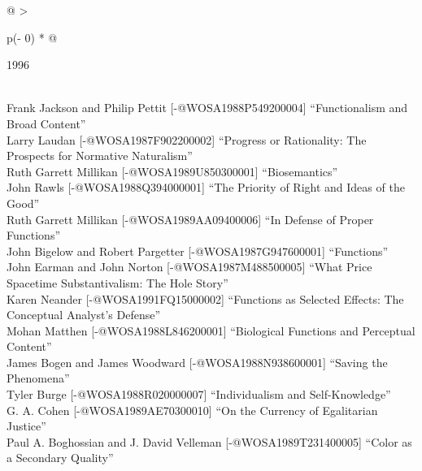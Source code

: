 \documentclass[
  10pt,
  letterpaper,
  DIV=11,
  numbers=noendperiod,
  twoside]{scrartcl}
\begin{document}
\begin{longtable}[]{@{}
  >{\raggedright\arraybackslash}p{(\columnwidth - 0\tabcolsep) * }@{}}

\caption{\label{tbl-top-ten-1987}Most cited articles published less than
ten years ago as of 1996.}

\tabularnewline

\toprule\noalign{}
\begin{minipage}[b]{\linewidth}\raggedright
1996
\end{minipage} \\
\midrule\noalign{}
\endhead
\bottomrule\noalign{}
\endlastfoot
Frank Jackson and Philip Pettit {[}-@WOSA1988P549200004{]}
``Functionalism and Broad Content'' \\
Larry Laudan {[}-@WOSA1987F902200002{]} ``Progress or Rationality: The
Prospects for Normative Naturalism'' \\
Ruth Garrett Millikan {[}-@WOSA1989U850300001{]} ``Biosemantics'' \\
John Rawls {[}-@WOSA1988Q394000001{]} ``The Priority of Right and Ideas
of the Good'' \\
Ruth Garrett Millikan {[}-@WOSA1989AA09400006{]} ``In Defense of Proper
Functions'' \\
John Bigelow and Robert Pargetter {[}-@WOSA1987G947600001{]}
``Functions'' \\
John Earman and John Norton {[}-@WOSA1987M488500005{]} ``What Price
Spacetime Substantivalism: The Hole Story'' \\
Karen Neander {[}-@WOSA1991FQ15000002{]} ``Functions as Selected
Effects: The Conceptual Analyst's Defense'' \\
Mohan Matthen {[}-@WOSA1988L846200001{]} ``Biological Functions and
Perceptual Content'' \\
James Bogen and James Woodward {[}-@WOSA1988N938600001{]} ``Saving the
Phenomena'' \\
Tyler Burge {[}-@WOSA1988R020000007{]} ``Individualism and
Self-Knowledge'' \\
G. A. Cohen {[}-@WOSA1989AE70300010{]} ``On the Currency of Egalitarian
Justice'' \\
Paul A. Boghossian and J. David Velleman {[}-@WOSA1989T231400005{]}
``Color as a Secondary Quality'' \\

\end{longtable}
\end{document}
